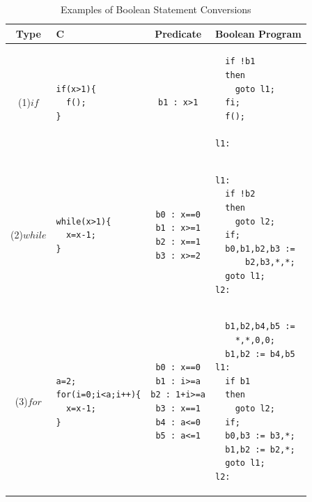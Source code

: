 \begin{table}
\label{table:ControlStatementConversions}
\center
\caption{Examples of Boolean Statement Conversions}
\begin{tabular}{c|l|c|l}
\hline
Type & C & Predicate & Boolean Program \\
\hline
(1)$if$&
\begin{lstlisting}
if(x>1){
  f();
}
\end{lstlisting}&
\begin{lstlisting}
b1 : x>1
\end{lstlisting}&
\begin{lstlisting}
  if !b1
  then
    goto l1;
  fi;
  f();

l1:
\end{lstlisting} \\
\hline
(2)$while$&
\begin{lstlisting}
while(x>1){
  x=x-1;
}
\end{lstlisting}&
\begin{lstlisting}
b0 : x==0
b1 : x>=1
b2 : x==1
b3 : x>=2
\end{lstlisting} &
\begin{lstlisting}
l1:
  if !b2
  then
    goto l2;
  if;
  b0,b1,b2,b3 :=
      b2,b3,*,*;
  goto l1;
l2:
\end{lstlisting} \\
\hline
(3)$for$&
\begin{lstlisting}
a=2;
for(i=0;i<a;i++){
  x=x-1;
}
\end{lstlisting} &
\begin{lstlisting}
b0 : x==0
b1 : i>=a
b2 : 1+i>=a
b3 : x==1
b4 : a<=0
b5 : a<=1
\end{lstlisting} &
\begin{lstlisting}
  b1,b2,b4,b5 :=
    *,*,0,0;
  b1,b2 := b4,b5
l1:
  if b1
  then
    goto l2;
  if;
  b0,b3 := b3,*;
  b1,b2 := b2,*;
  goto l1;
l2:
\end{lstlisting} \\
\hline
\end{tabular}
\end{table}


